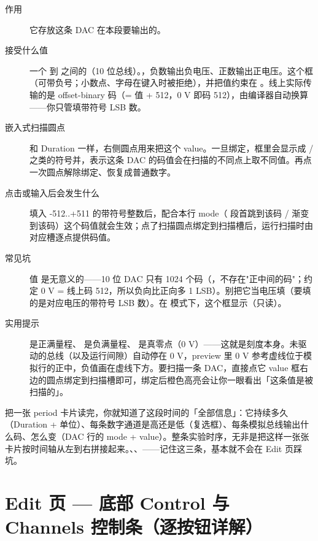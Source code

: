 \documentclass[11pt,oneside,openany]{book}
\begin{document}
\begin{description}
\item[作用] 它存放这条 DAC 在本段要输出的。
\item[接受什么值] 一个  到  之间的（10 位总线）。，负数输出负电压、正数输出正电压。这个框（可带负号；小数点、字母在键入时被拒绝），并把值约束在 \pyapi{[-512, +511]}。线上实际传输的是 offset-binary 码（= 值 + 512，0 V 即码 512），由编译器自动换算——你只管填带符号 LSB 数。
\item[嵌入式扫描圆点] 和 Duration 一样，右侧圆点用来把这个 value。一旦绑定，框里会显示成 / 之类的符号并，表示这条 DAC 的码值会在扫描的不同点上取不同值。再点一次圆点解除绑定、恢复成普通数字。
\item[点击或输入后会发生什么] 填入 -512..+511 的带符号整数后，配合本行 mode（ 段首跳到该码 /  渐变到该码）这个码值就会生效；点了扫描圆点绑定到扫描槽后，运行扫描时由对应槽逐点提供码值。
\item[常见坑] 值 是无意义的——10 位 DAC 只有 1024 个码（，不存在"正中间的码"；约定 0 V = 线上码 512，所以负向比正向多 1 LSB）。别把它当电压填（要填的是对应电压的带符号 LSB 数）。在  模式下，这个框显示（只读）。
\item[实用提示]  是正满量程、 是负满量程、 是真零点（0 V）——这就是刻度本身。未驱动的总线（以及运行间隙）自动停在 0 V，preview 里 0 V 参考虚线位于模拟行的正中，负值画在虚线下方。要扫描一条 DAC，直接点它 value 框右边的圆点绑定到扫描槽即可，绑定后橙色高亮会让你一眼看出「这条值是被扫描的」。
\end{description}

\begin{notebox}[一张卡片就是一段时间的全部状态]
把一张 period 卡片读完，你就知道了这段时间的「全部信息」：它持续多久（Duration + 单位）、每条数字通道是高还是低（复选框）、每条模拟总线输出什么码、怎么变（DAC 行的 mode + value）。整条实验时序，无非是把这样一张张卡片按时间轴从左到右拼接起来。、、——记住这三条，基本就不会在 Edit 页踩坑。
\end{notebox}

\section{Edit 页 — 底部 Control 与 Channels 控制条（逐按钮详解）}
\end{document}
